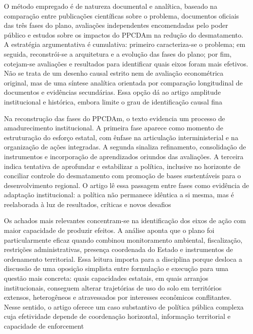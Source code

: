 \documentclass[12pt,a4paper]{article}
\begin{document}
O método empregado é de natureza documental e analítica, baseado na comparação entre publicações científicas sobre o problema, documentos oficiais das três fases do plano, avaliações independentes encomendadas pelo poder público e estudos sobre os impactos do PPCDAm na redução do desmatamento. A estratégia argumentativa é cumulativa: primeiro caracteriza-se o problema; em seguida, reconstrói-se a arquitetura e a evolução das fases do plano; por fim, cotejam-se avaliações e resultados para identificar quais eixos foram mais efetivos. Não se trata de um desenho causal estrito nem de avaliação econométrica original, mas de uma síntese analítica orientada por comparação longitudinal de documentos e evidências secundárias. Essa opção dá ao artigo amplitude institucional e histórica, embora limite o grau de identificação causal fina \parencite{mello2017_evolucao_plano}

Na reconstrução das fases do PPCDAm, o texto evidencia um processo de amadurecimento institucional. A primeira fase aparece como momento de estruturação do esforço estatal, com ênfase na articulação interministerial e na organização de ações integradas. A segunda sinaliza refinamento, consolidação de instrumentos e incorporação de aprendizados oriundos das avaliações. A terceira indica tentativa de aprofundar e estabilizar a política, inclusive no horizonte de conciliar controle do desmatamento com promoção de bases sustentáveis para o desenvolvimento regional. O artigo lê essa passagem entre fases como evidência de adaptação institucional: a política não permanece idêntica a si mesma, mas é reelaborada à luz de resultados, críticas e novos desafios \parencite{mello2017_evolucao_plano}

Os achados mais relevantes concentram-se na identificação dos eixos de ação com maior capacidade de produzir efeitos. A análise aponta que o plano foi particularmente eficaz quando combinou monitoramento ambiental, fiscalização, restrições administrativas, presença coordenada do Estado e instrumentos de ordenamento territorial. Essa leitura importa para a disciplina porque desloca a discussão de uma oposição simplista entre formulação e execução para uma questão mais concreta: quais capacidades estatais, em quais arranjos institucionais, conseguem alterar trajetórias de uso do solo em territórios extensos, heterogêneos e atravessados por interesses econômicos conflitantes. Nesse sentido, o artigo oferece um caso substantivo de política pública complexa cuja efetividade depende de coordenação horizontal, informação territorial e capacidade de enforcement \parencite{mello2017_evolucao_plano}
\end{document}
